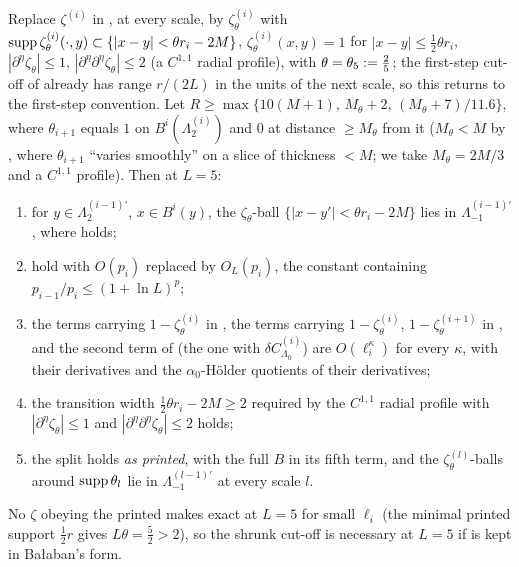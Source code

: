 \begin{proposition}\label{prop:a01:Zth}
Replace $\zeta^{(i)}$ in \cite[(2.44)]{Ba2}, at every scale, by $\zeta^{(i)}_\theta$ with $\operatorname{supp}\zeta^{(i)}_\theta(\cdot,y)\subset\{|x-y|<\theta r_i-2M\}$, $\zeta^{(i)}_\theta(x,y)=1$ for $|x-y|\le\frac12\theta r_i$, $|\partial^\eta\zeta_\theta|\le1$, $|\partial^\eta\partial^\eta\zeta_\theta|\le2$ (a $C^{1,1}$ radial profile), with $\theta=\theta_5:=\frac25$; the first-step cut-off of \cite[p.~561]{Ba2} already has range $r/(2L)$ in the units of the next scale, so this returns to the first-step convention. Let $R\ge\max\{10(M+1),\,M_\theta+2,\,(M_\theta+7)/11.6\}$, where $\theta_{i+1}$ equals $1$ on $B^i(\Lambda_2^{(i)})$ and $0$ at distance $\ge M_\theta$ from it ($M_\theta<M$ by \cite[p.~567]{Ba2}, where $\theta_{i+1}$ ``varies smoothly'' on a slice of thickness $<M$; we take $M_\theta=2M/3$ and a $C^{1,1}$ profile). Then at $L=5$:
\begin{enumerate}[label=\textup{(Z\arabic*)},nosep,leftmargin=*]
\item for $y\in\Lambda_2^{(i-1)\prime}$, $x\in B^i(y)$, the $\zeta_\theta$-ball $\{|x-y'|<\theta r_i-2M\}$ lies in $\Lambda_{-1}^{(i-1)\prime}$, where \cite[(2.55)]{Ba2} holds;
\item \cite[(2.59)--(2.60), (2.64)]{Ba2} hold with $O(p_i)$ replaced by $O_L(p_i)$, the constant containing $p_{i-1}/p_i\le(1+\ln L)^p$;
\item the terms carrying $1-\zeta^{(i)}_\theta$ in \cite[(2.61), (2.64)]{Ba2}, the terms carrying $1-\zeta^{(i)}_\theta$, $1-\zeta^{(i+1)}_\theta$ in \cite[(2.88)--(2.90)]{Ba2}, and the second term of \cite[(2.89)]{Ba2} (the one with $\delta C^{(i)}_{\Lambda_0}$) are $O(\ell_i^\kappa)$ for every $\kappa$, with their derivatives and the $\alpha_0$-H\"older quotients of their derivatives;
\item the transition width $\frac12\theta r_i-2M\ge2$ required by the $C^{1,1}$ radial profile with $|\partial^\eta\zeta_\theta|\le1$ and $|\partial^\eta\partial^\eta\zeta_\theta|\le2$ holds;
\item the split \cite[(2.89)]{Ba2} holds \emph{as printed}, with the full $B$ in its fifth term, and the $\zeta^{(l)}_\theta$-balls around $\operatorname{supp}\theta_l$ lie in $\Lambda_{-1}^{(l-1)\prime}$ at every scale $l$.
\end{enumerate}
No $\zeta$ obeying the printed \cite[(2.44)]{Ba2} makes \cite[(2.89)]{Ba2} exact at $L=5$ for small $\ell_i$ (the minimal printed support $\frac12r$ gives $L\theta=\frac52>2$), so the shrunk cut-off is necessary at $L=5$ if \cite[(2.89)]{Ba2} is kept in Ba{\l}aban's form.
\end{proposition}
